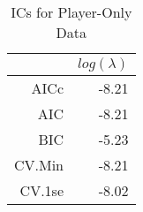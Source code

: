 \begin{table}[ht]
\centering
\begin{tabular}{rr}
  \hline
 & $log(\lambda)$ \\ 
  \hline
AICc & -8.21 \\ 
  AIC & -8.21 \\ 
  BIC & -5.23 \\ 
  CV.Min & -8.21 \\ 
  CV.1se & -8.02 \\ 
   \hline
\end{tabular}
\caption{ICs for Player-Only Data} 
\label{tab:pl_ic}
\end{table}
